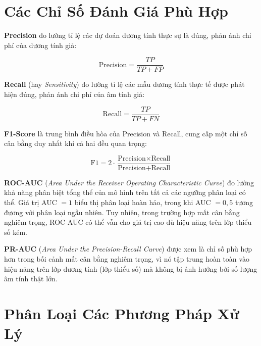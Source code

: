 \section{Các Chỉ Số Đánh Giá Phù Hợp}

\textbf{Precision} đo lường tỉ lệ các dự đoán dương tính thực sự là đúng, phản ánh chi phí của dương tính giả:

\begin{equation}
  \text{Precision} = \frac{TP}{TP + FP}
  \label{eq:precision}
\end{equation}

\textbf{Recall} (hay \textit{Sensitivity}) đo lường tỉ lệ các mẫu dương tính thực tế được phát hiện đúng, phản ánh chi phí của âm tính giả:

\begin{equation}
  \text{Recall} = \frac{TP}{TP + FN}
  \label{eq:recall}
\end{equation}

\textbf{F1-Score} là trung bình điều hòa của Precision và Recall, cung cấp một chỉ số cân bằng duy nhất khi cả hai đều quan trọng:

\begin{equation}
  \text{F1} = 2 \cdot \frac{\text{Precision} \times \text{Recall}}{\text{Precision} + \text{Recall}}
  \label{eq:f1}
\end{equation}

\textbf{ROC-AUC} (\textit{Area Under the Receiver Operating Characteristic Curve}) đo lường khả năng phân biệt tổng thể của mô hình trên tất cả các ngưỡng phân loại có thể. Giá trị AUC $= 1$ biểu thị phân loại hoàn hảo, trong khi AUC $= 0{,}5$ tương đương với phân loại ngẫu nhiên. Tuy nhiên, trong trường hợp mất cân bằng nghiêm trọng, ROC-AUC có thể vẫn cho giá trị cao dù hiệu năng trên lớp thiểu số kém.

\textbf{PR-AUC} (\textit{Area Under the Precision-Recall Curve}) được xem là chỉ số phù hợp hơn trong bối cảnh mất cân bằng nghiêm trọng, vì nó tập trung hoàn toàn vào hiệu năng trên lớp dương tính (lớp thiểu số) mà không bị ảnh hưởng bởi số lượng âm tính thật lớn.

\section{Phân Loại Các Phương Pháp Xử Lý}


